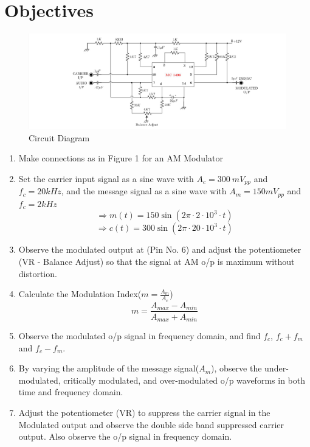\documentclass{article}
\begin{document}
\section{Objectives}
\begin{figure}[!ht]
  \caption{Circuit Diagram}
\includegraphics[width=\textwidth]{Circuit_diagram.png}
\end{figure}
\begin{enumerate}
  \item Make connections as in Figure 1 for an AM Modulator
  \item Set the carrier input signal as a sine wave with $A_c=300\ mV_{pp}$ and $f_c=20kHz$, and the message signal as a sine wave with $A_m=150mV_{pp}$ and $f_c=2kHz$
  \begin{equation}
      \Rightarrow m(t)=150\sin\left(2\pi\cdot 2\cdot 10^{3}\cdot t\right)
  \end{equation}
  \begin{equation}
      \Rightarrow c(t)=300\sin\left(2\pi\cdot 20\cdot 10^{3}\cdot t\right)
  \end{equation}
  \item Observe the modulated output at (Pin No. 6) and adjust the potentiometer (VR - Balance Adjust) so that the signal at AM o/p is maximum without distortion.
  \item Calculate the Modulation Index($m=\frac{A_m}{A_c}$)
    \begin{equation}
      m=\frac{A_{max}-A_{min}}{A_{max}+A_{min}}
    \end{equation}
  \item Observe the modulated o/p signal in frequency domain, and find $f_c$, $f_c+f_m$ and $f_c-f_m$.
  \item By varying the amplitude of the message signal($A_m$), observe the under-modulated, critically modulated, and over-modulated o/p waveforms in both time and frequency domain.
  \item Adjust the potentiometer (VR) to suppress the carrier signal in the Modulated output and observe the double side band suppressed carrier output. Also observe the o/p signal in frequency domain.
\end{enumerate}
\end{document}
